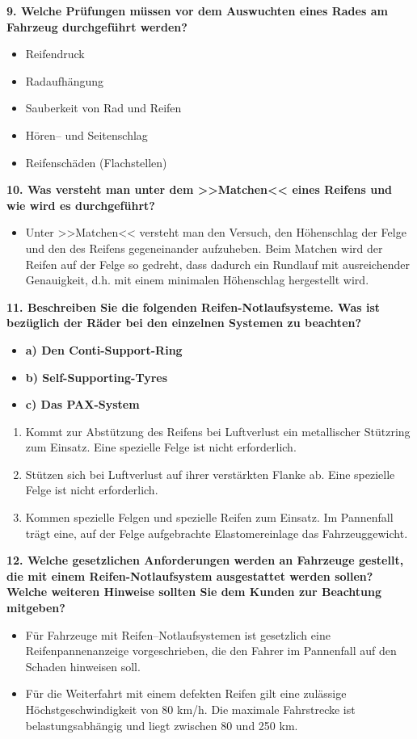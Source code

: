 \textbf{9. Welche Prüfungen müssen vor dem Auswuchten eines Rades am
Fahrzeug durchgeführt werden?}

\begin{itemize}
\item
  Reifendruck
\item
  Radaufhängung
\item
  Sauberkeit von Rad und Reifen
\item
  Hören-- und Seitenschlag
\item
  Reifenschäden (Flachstellen)
\end{itemize}

\textbf{10. Was versteht man unter dem >>Matchen<< eines Reifens und wie
wird es durchgeführt?}

\begin{itemize}
\item
  Unter >>Matchen<< versteht man den Versuch, den Höhenschlag der Felge
  und den des Reifens gegeneinander aufzuheben. Beim Matchen wird der
  Reifen auf der Felge so gedreht, dass dadurch ein Rundlauf mit
  ausreichender Genauigkeit, d.h. mit einem minimalen Höhenschlag
  hergestellt wird.
\end{itemize}

\textbf{11. Beschreiben Sie die folgenden Reifen-Notlaufsysteme. Was ist
bezüglich der Räder bei den einzelnen Systemen zu beachten?}

\begin{itemize}
\item
  \textbf{a) Den Conti-Support-Ring}
\item
  \textbf{b) Self-Supporting-Tyres}
\item
  \textbf{c) Das PAX-System}
\end{itemize}

\begin{enumerate}
\def\labelenumi{\alph{enumi})}
\item
  Kommt zur Abstützung des Reifens bei Luftverlust ein metallischer
  Stützring zum Einsatz. Eine spezielle Felge ist nicht erforderlich.
\item
  Stützen sich bei Luftverlust auf ihrer verstärkten Flanke ab. Eine
  spezielle Felge ist nicht erforderlich.
\item
  Kommen spezielle Felgen und spezielle Reifen zum Einsatz. Im
  Pannenfall trägt eine, auf der Felge aufgebrachte Elastomereinlage das
  Fahrzeuggewicht.
\end{enumerate}

\textbf{12. Welche gesetzlichen Anforderungen werden an Fahrzeuge
gestellt, die mit einem Reifen-Notlaufsystem ausgestattet werden sollen?
Welche weiteren Hinweise sollten Sie dem Kunden zur Beachtung mitgeben?}

\begin{itemize}
\item
  Für Fahrzeuge mit Reifen--Notlaufsystemen ist gesetzlich eine
  Reifenpannenanzeige vorgeschrieben, die den Fahrer im Pannenfall auf
  den Schaden hinweisen soll.
\item
  Für die Weiterfahrt mit einem defekten Reifen gilt eine zulässige
  Höchstgeschwindigkeit von 80 km/h. Die maximale Fahrstrecke ist
  belastungsabhängig und liegt zwischen 80 und 250 km.
\end{itemize}
